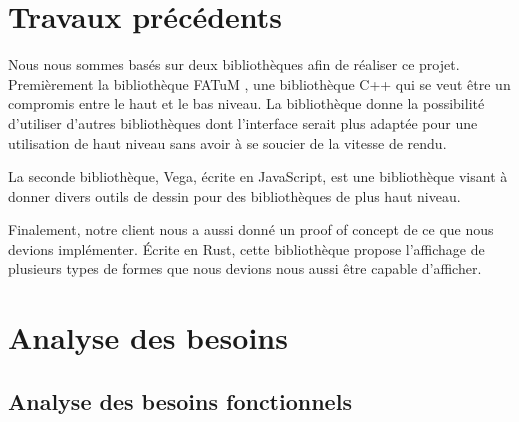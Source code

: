 \documentclass[12pt]{article}
\begin{document}
\section{Travaux précédents}

Nous nous sommes basés sur deux bibliothèques afin de réaliser ce projet.
Premièrement la bibliothèque FATuM \cite{FATuM}, une bibliothèque C++ qui se veut être un compromis entre le haut et le bas niveau. La bibliothèque 
donne la possibilité d'utiliser d'autres bibliothèques dont l'interface serait plus adaptée pour une utilisation de haut niveau sans avoir à se 
soucier de la vitesse de rendu.

La seconde bibliothèque, Vega\cite{VegaMarks}, écrite en JavaScript, est une bibliothèque visant à donner divers outils de dessin pour des 
bibliothèques de plus haut niveau.

Finalement, notre client nous a aussi donné un proof of concept de ce que nous devions implémenter. Écrite en Rust, cette bibliothèque propose 
l'affichage de plusieurs types de formes que nous devions nous aussi être capable d'afficher.

\section{Analyse des besoins}

\subsection{Analyse des besoins fonctionnels}
\end{document}

